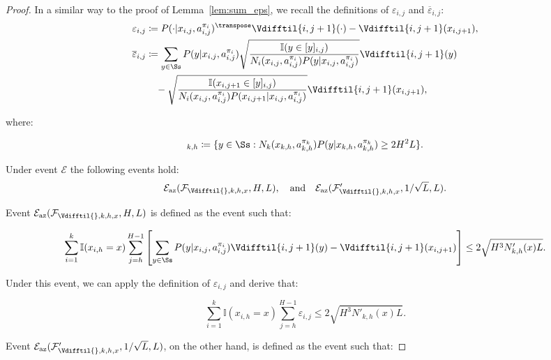 \begin{proof}
In a similar way to the proof of Lemma~\ref{lem:sum_eps}, we recall the definitions of $\varepsilon_{i,j}$ and $\overline{\varepsilon}_{i,j}$:
\begin{align*}
    \varepsilon_{i,j} &\coloneqq P(\cdot | x_{i,j}, a_{i,j}^{\pi_i})^\transpose \Vdifftil{i,j+1}(\cdot) - \Vdifftil{i,j+1}(x_{i,j+1}), \\
    \overline{\varepsilon}_{i,j} &\coloneqq \sum_{y\in\Ss} P(y|x_{i,j},a_{i,j}^{\pi_i}) \sqrt{\frac{\mathbb{I}(y \in [y]_{i,j})}{N_i(x_{i,j},a_{i,j}^{\pi_i})P(y|x_{i,j},a_{i,j}^{\pi_i})}} \Vdifftil{i,j+1}(y) \\
    &\quad - \sqrt{\frac{\mathbb{I}(x_{i,j+1} \in [y]_{i,j})}{N_i(x_{i,j},a_{i,j}^{\pi_i})P(x_{i,j+1}|x_{i,j},a_{i,j}^{\pi_i})}} \Vdifftil{i,j+1}(x_{i,j+1}),
\end{align*}

where:

\begin{equation*}
    [y]_{k,h} \coloneqq \{ y \in \Ss : N_k(x_{k,h}, a_{k,h}^{\pi_k}) P(y | x_{k,h}, a_{k,h}^{\pi_k}) \ge 2 H^2L \}.
\end{equation*}

Under event $\mathcal{E}$ the following events hold:
\begin{equation*}
    \mathcal{E}_{\mathrm{az}}(\mathcal{F}_{\Vdifftil{}, k, h, x}, H, L), \quad\text{and}\quad
    \mathcal{E}_{\mathrm{az}}(\mathcal{F}'_{\Vdifftil{}, k, h, x}, 1/\sqrt{L}, L).
\end{equation*}

Event $\mathcal{E}_{\mathrm{az}}(\mathcal{F}_{\Vdifftil{}, k, h, x}, H, L)$ is defined as the event such that:

\begin{align*}
    \sum_{i=1}^k \mathbb{I}(x_{i,h}=x) \sum_{j=h}^{H-1} \left[ \sum_{y\in\Ss} P(y|x_{i,j},a_{i,j}^{\pi_i})\Vdifftil{i,j+1}(y) - \Vdifftil{i,j+1}(x_{i,j+1}) \right] \le 2 \sqrt{H^3 N'_{k,h}(x) L}.
\end{align*}

Under this event, we can apply the definition of $\varepsilon_{i,j}$ and derive that:

\begin{equation*}
    \sum_{i=1}^k \mathbb{I}(x_{i,h}=x) \sum_{j=h}^{H-1} \varepsilon_{i,j} \le 2 \sqrt{H^3 N'_{k,h}(x) L}.
\end{equation*}

Event $\mathcal{E}_{\mathrm{az}}(\mathcal{F}'_{\Vdifftil{}, k, h, x}, 1/\sqrt{L}, L)$, on the other hand, is defined as the event such that:


\end{proof}

